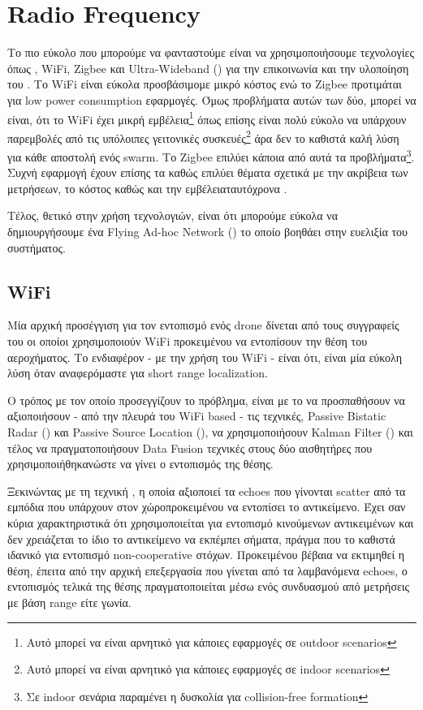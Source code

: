 \section{Radio Frequency}
Το πιο εύκολο που μπορούμε να φανταστούμε είναι να χρησιμοποιήσουμε  τε\-χνο\-λο\-γίες όπως , WiFi, 
Zigbee και Ultra-Wideband () για την επικοινωνία και την υλοποίηση του . Το WiFi είναι εύκολα 
προσβάσιμο\udot με μικρό κόστος ενώ το Zigbee προτιμάται για low power consumption εφαρμογές. Όμως προβλήματα αυτών 
των δύο, μπορεί να είναι, ότι το WiFi έχει μικρή 
εμβέλεια\footnote{Αυτό μπορεί να είναι αρνητικό για κάποιες εφαρμογές σε outdoor scenarios} 
όπως επίσης είναι πολύ εύκολο να υπάρχουν παρεμβολές από τις υπόλοιπες γειτονικές 
συσκευές\footnote{Αυτό μπορεί να είναι αρνητικό για κάποιες εφαρμογές σε indoor scenarios} 
άρα δεν το καθιστά καλή λύση για κάθε αποστολή ενός swarm. Το Zigbee επιλύει κάποια από αυτά τα 
προβλήματα\footnote{Σε indoor σενάρια παραμένει η δυσκολία για collision-free formation}. 
Συχνή εφαρμογή έχουν επίσης τα  καθώς επιλύει θέματα σχετικά με την ακρίβεια των μετρήσεων, 
το κόστος καθώς και την εμβέλεια\udot ταυτόχρονα \cite{uwb-imu-gps3}. 

Τέλος, θετικό στην χρήση  τεχνολογιών, είναι ότι μπορούμε εύκολα να δημιουργήσουμε
ένα Flying Ad-hoc Network () το οποίο βοηθάει στην ευελιξία του συστήματος.

\subsection{WiFi}
Μία αρχική προσέγγιση για τον εντοπισμό ενός drone δίνεται από τους συγγραφείς του \cite{wifi-passive-active-drone-localization}
οι οποίοι χρησιμοποιούν WiFi προκειμένου να εντοπίσουν την θέση του αεροχήματος. Το ενδιαφέρον - με την χρήση του WiFi - είναι ότι, 
είναι μία εύκολη λύση όταν αναφερόμαστε για short range localization. 

Ο τρόπος με τον οποίο προσεγγίζουν το πρόβλημα, είναι με 
το να προσπαθήσουν να αξιοποιήσουν - από την πλευρά του WiFi based - τις τεχνικές, 
Passive Bistatic Radar () και Passive Source Location (), να χρησιμοποιήσουν Kalman Filter ()
και τέλος να πραγματοποιήσουν Data Fusion τεχνικές στους δύο αισθητήρες που χρησιμοποιήθηκαν\udot ώστε να γίνει ο εντοπισμός της θέσης.

Ξεκινώντας με τη τεχνική , η οποία αξιοποιεί τα echoes που
γίνονται scatter από τα εμπόδια που υπάρχουν στον χώρο\udot προκειμένου να εντοπίσει το αντικείμενο. Έχει σαν κύρια χαρακτηριστικά 
ότι χρησιμοποιείται για εντοπισμό κινούμενων αντικειμένων και δεν χρειάζεται το ίδιο το αντικείμενο να εκπέμπει σήματα, πράγμα που 
το καθιστά ιδανικό για εντοπισμό non-cooperative στόχων. Προκειμένου βέβαια να εκτιμηθεί η θέση, έπειτα από την αρχική επεξεργασία 
που γίνεται από τα λαμβανόμενα echoes, ο εντοπισμός τελικά της θέσης πραγματοποιείται μέσω ενός συνδυασμού από μετρήσεις με βάση 
range είτε γωνία. 

